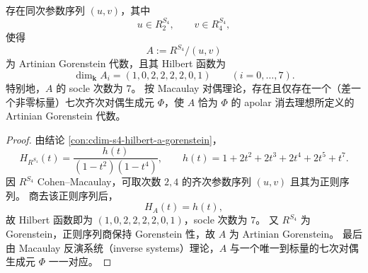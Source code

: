 \begin{conclusion}\label{con:cdim-s4-artinian-gorenstein-dual-generator}
存在同次参数序列 \((u,v)\)，其中
\[
u\in R^{S_4}_2,\qquad v\in R^{S_4}_4,
\]
使得
\[
A:=R^{S_4}/(u,v)
\]
为 Artinian Gorenstein 代数，且其 Hilbert 函数为
\[
\dim_{\mathbf k}A_i=(1,0,2,2,2,2,0,1)\qquad(i=0,\dots,7).
\]
特别地，\(A\) 的 socle 次数为 \(7\)。
按 Macaulay 对偶理论，存在且仅存在一个（差一个非零标量）七次齐次对偶生成元 \(\Phi\)，使 \(A\) 恰为 \(\Phi\) 的 apolar 消去理想所定义的 Artinian Gorenstein 代数。
\end{conclusion}
\begin{proof}
由结论 \ref{con:cdim-s4-hilbert-a-gorenstein}，
\[
H_{R^{S_4}}(t)=\frac{h(t)}{(1-t^2)(1-t^4)},\qquad
h(t)=1+2t^2+2t^3+2t^4+2t^5+t^7.
\]
因 \(R^{S_4}\) Cohen--Macaulay，可取次数 \(2,4\) 的齐次参数序列 \((u,v)\) 且其为正则序列。
商去该正则序列后，
\[
H_A(t)=h(t),
\]
故 Hilbert 函数即为 \((1,0,2,2,2,2,0,1)\)，socle 次数为 \(7\)。
又 \(R^{S_4}\) 为 Gorenstein，正则序列商保持 Gorenstein 性，故 \(A\) 为 Artinian Gorenstein。
最后由 Macaulay 反演系统（inverse systems）理论，\(A\) 与一个唯一到标量的七次对偶生成元 \(\Phi\) 一一对应。
\end{proof}

